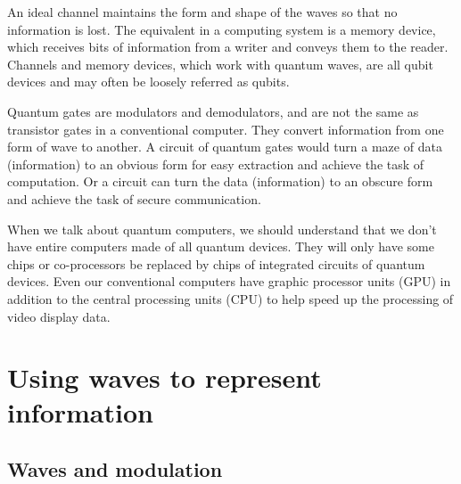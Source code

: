 \documentclass{book}
\begin{document}
An ideal channel maintains the form and shape of the waves so that no information is lost. The equivalent in a computing system is a memory device, which receives bits of information from a writer and conveys them to the reader. Channels and memory devices, which work with quantum waves, are all qubit devices and may often be loosely referred as qubits.

Quantum gates are modulators and demodulators, and are not the same as transistor gates in a conventional computer. They convert information from one form of wave to another. A circuit of quantum gates would turn a maze of data (information) to an obvious form for easy extraction and achieve the task of computation. Or a circuit can turn the data (information) to an obscure form and achieve the task of secure communication.

When we talk about quantum computers, we should understand that we don't have entire computers made of all quantum devices. They will only have some chips or co-processors be replaced by chips of integrated circuits of quantum devices. Even our conventional computers have graphic processor units (GPU) in addition to the central processing units (CPU) to help speed up the processing of video display data.

\chapter{Using waves to represent information}

\section{Waves and modulation}
\end{document}

